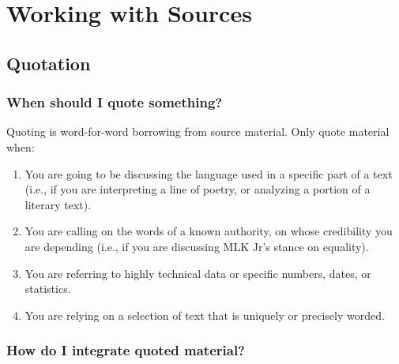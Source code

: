 

\chapter{Working with Sources}
\section{Quotation}
 
\subsection{When should I quote something?}

Quoting is word-for-word borrowing from source material. Only quote material when:
 
\begin{enumerate}

\item You are going to be discussing the language used in a specific part of a text (i.e., 
if you are interpreting a line of poetry, or analyzing a portion of a literary text).
 
\item You are calling on the words of a known authority, on whose credibility you are 
depending (i.e., if you are discussing MLK Jr's stance on equality).
 
\item You are referring to highly technical data or specific numbers, dates, or statistics.
 
\item You are relying on a selection of text that is uniquely or precisely worded.
 
 \end{enumerate}
 
\subsection{How do I integrate quoted material?}
 
